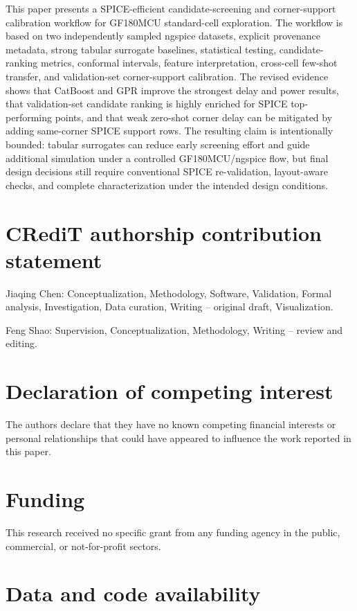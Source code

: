 \documentclass[preprint,12pt]{elsarticle}
\begin{document}
This paper presents a SPICE-efficient candidate-screening and corner-support calibration workflow for GF180MCU standard-cell exploration. The workflow is based on two independently sampled ngspice datasets, explicit provenance metadata, strong tabular surrogate baselines, statistical testing, candidate-ranking metrics, conformal intervals, feature interpretation, cross-cell few-shot transfer, and validation-set corner-support calibration. The revised evidence shows that CatBoost and GPR improve the strongest delay and power results, that validation-set candidate ranking is highly enriched for SPICE top-performing points, and that weak zero-shot corner delay can be mitigated by adding same-corner SPICE support rows. The resulting claim is intentionally bounded: tabular surrogates can reduce early screening effort and guide additional simulation under a controlled GF180MCU/ngspice flow, but final design decisions still require conventional SPICE re-validation, layout-aware checks, and complete characterization under the intended design conditions.

\section*{CRediT authorship contribution statement}

Jiaqing Chen: Conceptualization, Methodology, Software, Validation, Formal analysis, Investigation, Data curation, Writing -- original draft, Visualization.

Feng Shao: Supervision, Conceptualization, Methodology, Writing -- review and editing.

\section*{Declaration of competing interest}

The authors declare that they have no known competing financial interests or personal relationships that could have appeared to influence the work reported in this paper.

\section*{Funding}

This research received no specific grant from any funding agency in the public, commercial, or not-for-profit sectors.

\section*{Data and code availability}
\end{document}
